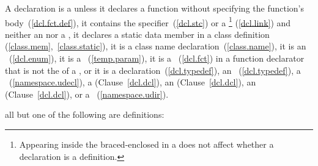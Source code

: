 \pnum
{}%
%
A declaration is a  unless it declares a function
without specifying the function's body~(\ref{dcl.fct.def}), it contains
the
%
 specifier~(\ref{dcl.stc}) or a
\footnote{Appearing inside the braced-enclosed
 in a  does
not affect whether a declaration is a definition.}
(\ref{dcl.link}) and neither an  nor a
,
%
it declares a static data member in a class
definition (\ref{class.mem},~\ref{class.static}),
%
it is a class name declaration~(\ref{class.name}),
it is an
%
~(\ref{dcl.enum}),
it is a
%
~(\ref{temp.param}),
it is a
%
~(\ref{dcl.fct}) in a function
%
declarator that is not the  of a
,
or it is a
%
 declaration~(\ref{dcl.typedef}),
an ~(\ref{dcl.typedef}),
a
~(\ref{namespace.udecl}),
a  (Clause~\ref{dcl.dcl}), an
 (Clause~\ref{dcl.dcl}), an
 (Clause~\ref{dcl.dcl}),
or a ~(\ref{namespace.udir}).

\enterexample all but one of the following are definitions:

